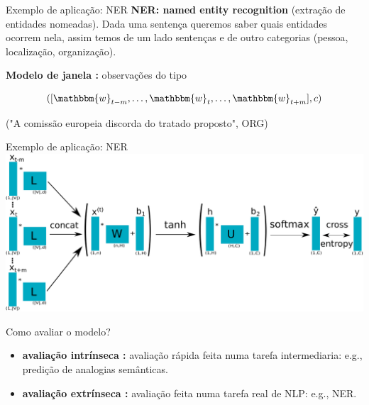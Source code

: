 \documentclass{beamer}
\newcommand{\wo}{\mathbbm{w}}
\begin{document}
\begin{frame}[fragile]{Exemplo de aplicação: NER}
\textbf{NER: named entity recognition} (extração de entidades nomeadas).
Dada uma sentença queremos saber quais entidades ocorrem nela, assim temos de um lado sentenças e de outro categorias (pessoa, localização, organização).

\vspace{0.1cm}

\textbf{Modelo de janela :} observações do tipo 

\[
([\wo_{t-m}, \dots, \wo_{t}, \dots, \wo_{t+m}],c)
\]
\begin{center}
("A comissão europeia discorda do tratado proposto", ORG)
\end{center}
\end{frame}

\begin{frame}[fragile]{Exemplo de aplicação: NER}
\includegraphics[scale=0.57]{ner.pdf}
\end{frame}

\begin{frame}[fragile]{Como avaliar o modelo?}
\begin{itemize}
\item \textbf{avaliação intrínseca :} avaliação rápida feita numa tarefa intermediaria: e.g., predição de analogias semânticas.
\vspace{0.3cm}
\item \textbf{avaliação extrínseca :} avaliação feita numa tarefa real de NLP: e.g., NER.
\end{itemize}
\end{frame}
\end{document}
